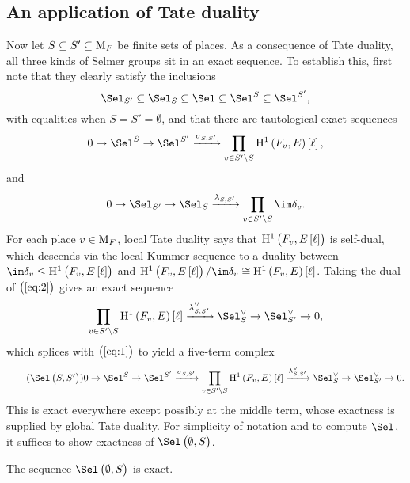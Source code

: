 \subsection{An application of Tate duality}

Now let $ S \subseteq S' \subseteq \mathrm{M}_F $ be finite sets of places. As a consequence of Tate duality, all three kinds of Selmer groups sit in an exact sequence. To establish this, first note that they clearly satisfy the inclusions
$$ \Sel_{S'} \subseteq \Sel_S \subseteq \Sel \subseteq \Sel^S \subseteq \Sel^{S'}, $$
with equalities when $ S = S' = \emptyset $, and that there are tautological exact sequences
\begin{equation}
\label{eq:1}
0 \to \Sel^S \to \Sel^{S'} \xrightarrow{\sigma_{S, S'}} \prod_{v \in S' \setminus S} \H^1\br{F_v, E}\sbr{\ell},
\end{equation}
and
\begin{equation}
\label{eq:2}
0 \to \Sel_{S'} \to \Sel_S \xrightarrow{\lambda_{S, S'}} \prod_{v \in S' \setminus S} \im \delta_v.
\end{equation}
For each place $ v \in \mathrm{M}_F $, local Tate duality says that $ \H^1\br{F_v, E\sbr{\ell}} $ is self-dual, which descends via the local Kummer sequence to a duality between $ \im \delta_v \le \H^1\br{F_v, E\sbr{\ell}} $ and $ \H^1\br{F_v, E\sbr{\ell}} / \im \delta_v \cong \H^1\br{F_v, E}\sbr{\ell} $. Taking the dual of $ \br{\ref{eq:2}} $ gives an exact sequence
$$ \prod_{v \in S' \setminus S} \H^1\br{F_v, E}\sbr{\ell} \xrightarrow{\lambda_{S, S'}^\vee} \Sel_S^\vee \to \Sel_{S'}^\vee \to 0, $$
which splices with $ \br{\ref{eq:1}} $ to yield a five-term complex
\begin{equation}
\tag{$ \Sel\br{S, S'} $}
0 \to \Sel^S \to \Sel^{S'} \xrightarrow{\sigma_{S, S'}} \prod_{v \in S' \setminus S} \H^1\br{F_v, E}\sbr{\ell} \xrightarrow{\lambda_{S, S'}^\vee} \Sel_S^\vee \to \Sel_{S'}^\vee \to 0.
\end{equation}
This is exact everywhere except possibly at the middle term, whose exactness is supplied by global Tate duality. For simplicity of notation and to compute $ \Sel $, it suffices to show exactness of $ \Sel\br{\emptyset, S} $.

\pagebreak

\begin{proposition}
\label{prop:tateduality}
The sequence $ \Sel\br{\emptyset, S} $ is exact.
\end{proposition}

